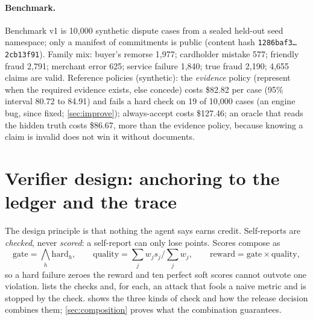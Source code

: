 \documentclass[11pt]{article}
\theoremstyle{definition}
\theoremstyle{remark}
\newcommand{\1}{\mathbf{1}}
\begin{document}
\paragraph{Benchmark.} Benchmark v1 is 10{,}000 synthetic dispute cases from a sealed held-out seed namespace; only a manifest of commitments is public (content hash \texttt{1286baf3\ldots2cb13f91}). Family mix: buyer's remorse 1{,}977; cardholder mistake 577; friendly fraud 2{,}791; merchant error 625; service failure 1{,}840; true fraud 2{,}190; 4{,}655 claims are valid. Reference policies (synthetic): the \emph{evidence} policy (represent when the required evidence exists, else concede) costs \$82.82 per case (95\% interval 80.72 to 84.91) and fails a hard check on 19 of 10{,}000 cases (an engine bug, since fixed; \cref{sec:improve}); always-accept costs \$127.46; an oracle that reads the hidden truth costs \$86.67, more than the evidence policy, because knowing a claim is invalid does not win it without documents.

\section{Verifier design: anchoring to the ledger and the trace}\label{sec:verifiers}

The design principle is that nothing the agent says earns credit. Self-reports are \emph{checked}, never \emph{scored}: a self-report can only lose points. Scores compose as
\begin{equation}\label{eq:reward}
\text{gate} = \textstyle\bigwedge_{h}\text{hard}_h,\qquad \text{quality} = \sum_j w_j s_j \big/ \sum_j w_j,\qquad \text{reward} = \text{gate}\times\text{quality},
\end{equation}
so a hard failure zeroes the reward and ten perfect soft scores cannot outvote one violation.  lists the checks and, for each, an attack that fools a naive metric and is stopped by the check.  shows the three kinds of check and how the release decision combines them; \cref{sec:composition} proves what the combination guarantees.
\end{document}
